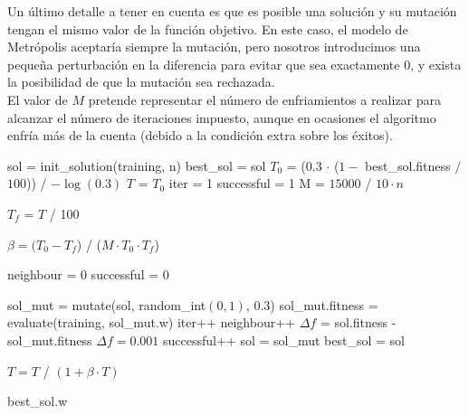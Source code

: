 \documentclass[12pt]{article}
\begin{document}
Un último detalle a tener en cuenta es que es posible una solución y su mutación tengan el mismo valor de la función objetivo. En este caso, el modelo de Metrópolis aceptaría siempre la mutación, pero nosotros introducimos una pequeña perturbación en la diferencia para evitar que sea exactamente $0$, y exista la posibilidad de que la mutación sea rechazada.\\

El valor de $M$ pretende representar el número de enfriamientos a realizar para alcanzar el número de iteraciones impuesto, aunque en ocasiones el algoritmo enfría más de la cuenta (debido a la condición extra sobre los éxitos).

\begin{algorithm}[h!]
\begin{algorithmic}


\State sol = init\_solution(training, n)
\State best\_sol = sol
\State $T_0$ = ($0.3$ $\cdot$ ($1 - $ best\_sol.fitness $/$ $100$)) / $- \log(0.3)$
\State $T$ = $T_0$
\State iter = 1
\State successful = 1
\State M = $ 15000$ / $10 \cdot n$

 
    \State $T_f$ = $T$ / 100
\EndWhile

\State $\beta = (T_0 - T_f$) / ($M \cdot T_0 \cdot T_f$)

    \State neighbour = 0
    \State successful = 0

    \State sol\_mut = mutate(sol, random\_int$(0,1)$, 0.3)
    \State sol\_mut.fitness = evaluate(training, sol\_mut.w)
    \State iter++
    \State neighbour++
    \State $\Delta f$ = sol.fitness - sol\_mut.fitness
        \State $\Delta f = 0.001$
    \EndIf 
      
        \State successful++
        \State sol = sol\_mut
            \State best\_sol = sol
        \EndIf
    \EndIf
    \EndWhile
    
    \State $T = T$ / $(1 + \beta \cdot T)$  

\EndWhile

\Return best\_sol.w

\EndFunction
\end{algorithmic}
\end{algorithm}
\end{document}
